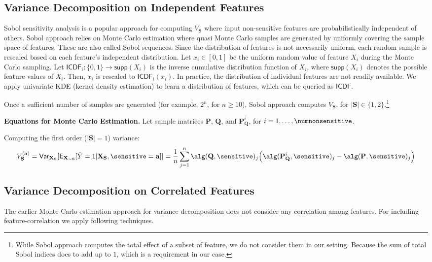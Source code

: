 \subsection{Variance Decomposition on Independent Features}

Sobol sensitivity analysis is a popular approach for computing $ V_{\mathbf{S}} $ where input non-sensitive features are probabilistically independent of others. Sobol approach relies on Monte Carlo estimation where quasi Monte Carlo samples are generated by uniformly covering the sample space of features. These are also called Sobol sequences. Since the distribution of features is not necessarily uniform, each random sample is rescaled based on each feature's independent distribution. Let $ x_i \in [0,1] $ be the uniform random value of feature $ X_i $ during the Monte Carlo sampling. Let $ \mathsf{ICDF}_{i}: \{0,1\} \rightarrow \mathsf{supp}(X_i) $ is the inverse cumulative distribution function of $ X_i $, where $ \mathsf{supp}(X_i) $ denotes the possible feature values of $ X_i $. Then, $ x_i $ is rescaled to $ \mathsf{ICDF}_{i}(x_i) $.  In practice, the distribution of individual features are not readily available. We apply univariate KDE (kernel density estimation) to learn a distribution of features, which can be queried as $ \mathsf{ICDF} $. 

Once a sufficient number of samples are generated (for example, $ 2^n $, for $ n \ge 10 $), Sobol approach computes $ V_{\mathbf{S}} $, for $ |\mathbf{S}| \in \{1,2\} $.\footnote{While Sobol approach computes the total effect of a subset of feature, we do not consider them in our setting. Because the sum of total Sobol indices does to add up to $ 1 $, which is a  requirement in our case.} 

\textbf{Equations for Monte Carlo Estimation.}
Let sample matrices $ \mathbf{P} $, $ \mathbf{Q} $, and $ \mathbf{P}_{\mathbf{Q}}^i $, for $ i = 1, \dots, \numnonsensitive $. 

Computing the first order ($ |\mathbf{S}| = 1 $) variance: 
\[
V_{\mathbf{S}}^{(\mathbf{a})} = 
\mathsf{Var}_{\mathbf{X}_{\mathbf{S}}}[\mathsf{E}_{\mathbf{X}_{\sim \mathbf{S}}}[\hat{Y} = 1 | \mathbf{X}_{\mathbf{S}}, \sensitive = \mathbf{a}]] = \frac{1}{n}\sum_{j=1}^{n}\alg(\mathbf{Q}, \sensitive)_j\Big(\alg(\mathbf{P}_{\mathbf{Q}}^i, \sensitive)_j - \alg(\mathbf{P}, \sensitive)_j\Big)
\]



\subsection{Variance Decomposition on Correlated Features}
The earlier Monte Carlo estimation approach for variance decomposition does not consider any correlation among features. For including feature-correlation we apply following techniques. 

